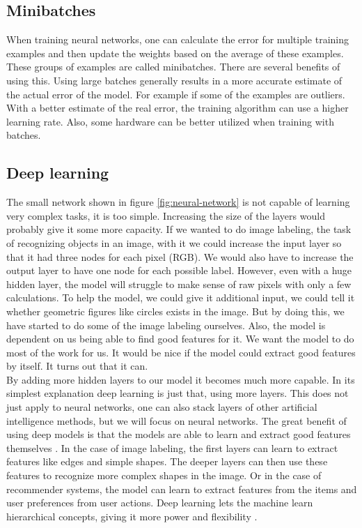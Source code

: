 \subsection{Minibatches}
When training neural networks, one can calculate the error for multiple training examples and then update the weights based on the average of these examples. These groups of examples are called minibatches. There are several benefits of using this. Using large batches generally results in a more accurate estimate of the actual error of the model. For example if some of the examples are outliers. With a better estimate of the real error, the training algorithm can use a higher learning rate. Also, some hardware can be better utilized when training with batches. \cite{Goodfellow-et-al-2016-Book}

\subsection{Deep learning}
The small network shown in figure \ref{fig:neural-network} is not capable of learning very complex tasks, it is too simple.  Increasing the size of the layers would probably give it some more capacity. If we wanted to do image labeling, the task of recognizing objects in an image, with it we could increase the input layer so that it had three nodes for each pixel (RGB). We would also have to increase the output layer to have one node for each possible label. However, even with a huge hidden layer, the model will struggle to make sense of raw pixels with only a few calculations. To help the model, we could give it additional input, we could tell it whether geometric figures like circles exists in the image. But by doing this, we have started to do some of the image labeling ourselves. Also, the model is dependent on us being able to find good features for it. We want the model to do most of the work for us. It would be nice if the model could extract good features by itself. It turns out that it can.\\

By adding more hidden layers to our model it becomes much more capable. In its simplest explanation deep learning is just that, using more layers. This does not just apply to neural networks, one can also stack layers of other artificial intelligence methods, but we will focus on neural networks. The great benefit of using deep models is that the models are able to learn and extract good features themselves \cite{Goodfellow-et-al-2016-Book}. In the case of image labeling, the first layers can learn to extract features like edges and simple shapes. The deeper layers can then use these features to recognize more complex shapes in the image. Or in the case of recommender systems, the model can learn to extract features from the items and user preferences from user actions. Deep learning lets the machine learn hierarchical concepts, giving it more power and flexibility \cite{Goodfellow-et-al-2016-Book}.

